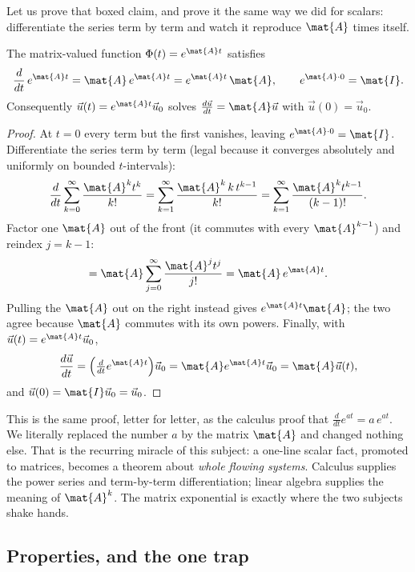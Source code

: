 Let us prove that boxed claim, and prove it the same way we did for scalars:
differentiate the series term by term and watch it reproduce $\mat{A}$ times
itself.

\begin{theorem}
\label{ch25:thm-solves}
The matrix-valued function $\Phi(t) = e^{\mat{A}t}$ satisfies
\[
  \frac{d}{dt}\,e^{\mat{A}t} = \mat{A}\,e^{\mat{A}t} = e^{\mat{A}t}\,\mat{A},
  \qquad e^{\mat{A}\cdot 0} = \mat{I}.
\]
Consequently $\vec{u}(t) = e^{\mat{A}t}\vec{u}_0$ solves
$\frac{d\vec{u}}{dt}=\mat{A}\vec{u}$ with $\vec{u}(0)=\vec{u}_0$.
\end{theorem}

\begin{proof}
At $t=0$ every term but the first vanishes, leaving $e^{\mat{A}\cdot 0}=\mat{I}$.
Differentiate the series term by term (legal because it converges absolutely and
uniformly on bounded $t$-intervals):
\[
  \frac{d}{dt}\sum_{k=0}^\infty \frac{\mat{A}^k t^k}{k!}
  = \sum_{k=1}^\infty \frac{\mat{A}^k\, k\, t^{k-1}}{k!}
  = \sum_{k=1}^\infty \frac{\mat{A}^k t^{k-1}}{(k-1)!}.
\]
Factor one $\mat{A}$ out of the front (it commutes with every $\mat{A}^{k-1}$) and
reindex $j=k-1$:
\[
  = \mat{A}\sum_{j=0}^\infty \frac{\mat{A}^j t^j}{j!}
  = \mat{A}\,e^{\mat{A}t}.
\]
Pulling the $\mat{A}$ out on the right instead gives $e^{\mat{A}t}\mat{A}$; the
two agree because $\mat{A}$ commutes with its own powers. Finally, with
$\vec{u}(t) = e^{\mat{A}t}\vec{u}_0$,
\[
  \frac{d\vec{u}}{dt} = \Bigl(\tfrac{d}{dt}e^{\mat{A}t}\Bigr)\vec{u}_0
  = \mat{A}e^{\mat{A}t}\vec{u}_0 = \mat{A}\vec{u}(t),
\]
and $\vec{u}(0)=\mat{I}\vec{u}_0=\vec{u}_0$.
\end{proof}

\begin{connectionbox}
This is the same proof, letter for letter, as the calculus proof that
$\frac{d}{dt}e^{at} = a\,e^{at}$. We literally replaced the number $a$ by the
matrix $\mat{A}$ and changed nothing else. That is the recurring miracle of this
subject: a one-line scalar fact, promoted to matrices, becomes a theorem about
\emph{whole flowing systems}. Calculus supplies the power series and term-by-term
differentiation; linear algebra supplies the meaning of $\mat{A}^k$. The matrix
exponential is exactly where the two subjects shake hands.
\end{connectionbox}

\subsection{Properties, and the one trap}
\label{ch25:props}

